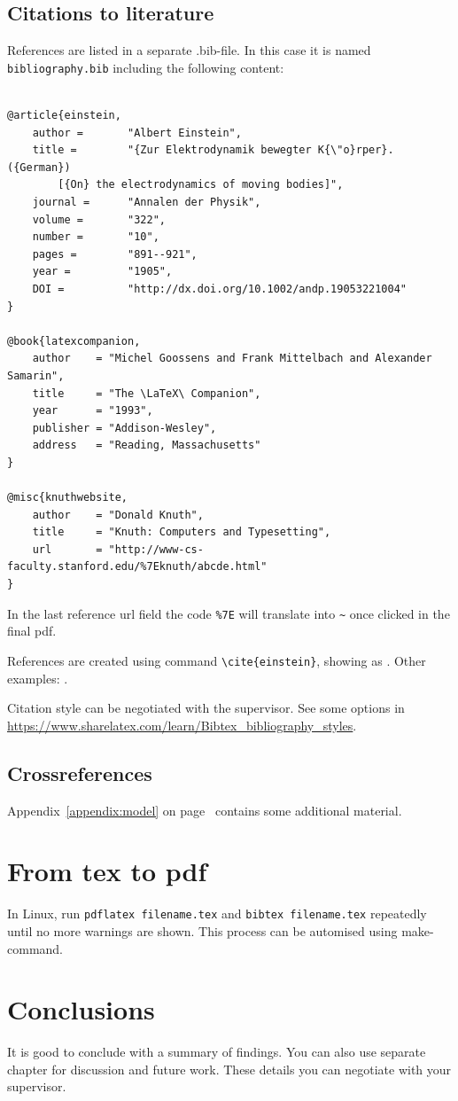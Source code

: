 \section{Citations to literature}

References are listed in a separate .bib-file. In this case it is named \texttt{bibliography.bib} including the following content:
\begin{verbatim}

@article{einstein,
    author =       "Albert Einstein",
    title =        "{Zur Elektrodynamik bewegter K{\"o}rper}. ({German})
        [{On} the electrodynamics of moving bodies]",
    journal =      "Annalen der Physik",
    volume =       "322",
    number =       "10",
    pages =        "891--921",
    year =         "1905",
    DOI =          "http://dx.doi.org/10.1002/andp.19053221004"
}
 
@book{latexcompanion,
    author    = "Michel Goossens and Frank Mittelbach and Alexander Samarin",
    title     = "The \LaTeX\ Companion",
    year      = "1993",
    publisher = "Addison-Wesley",
    address   = "Reading, Massachusetts"
}
 
@misc{knuthwebsite,
    author    = "Donald Knuth",
    title     = "Knuth: Computers and Typesetting",
    url       = "http://www-cs-faculty.stanford.edu/%7Eknuth/abcde.html"
}
\end{verbatim}

In the last reference url field the code \verb+%7E+ will translate into \verb+~+ once clicked in the final pdf.

References are created using command \texttt{\textbackslash cite\{einstein\}}, showing as \citep{einstein}. Other examples: \citep{latexcompanion,knuthwebsite}.

Citation style can be negotiated with the supervisor. See some options in \url{https://www.sharelatex.com/learn/Bibtex_bibliography_styles}.

\section{Crossreferences}

Appendix~\ref{appendix:model} on page~\pageref{appendix:model} contains some additional material.

\chapter{From tex to pdf}

In Linux, run \texttt{pdflatex filename.tex} and \texttt{bibtex filename.tex} repeatedly until no more warnings are shown. This process can be automised using make-command.
 
\chapter{Conclusions\label{chapter:conclusions}}

It is good to conclude with a summary of findings. You can also use separate chapter for discussion and future work. These details you can negotiate with your supervisor.

